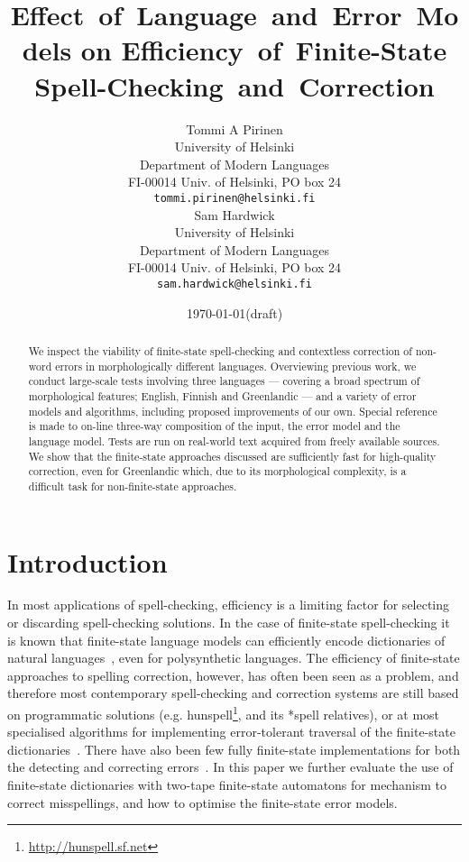 \documentclass[11pt]{article}
\title{Effect~of~Language~and~Error~Models on Efficiency~of~Finite-State
Spell-Checking~and~Correction}
\author{
Tommi A Pirinen\\
University of Helsinki\\
Department of Modern Languages\\
FI-00014 Univ. of Helsinki, PO box 24\\
{\tt tommi.pirinen@helsinki.fi} \\\And
Sam Hardwick\\
University of Helsinki\\
Department of Modern Languages\\
FI-00014 Univ. of Helsinki, PO box 24\\
{\tt sam.hardwick@helsinki.fi} \\
}
\date{\today (draft)}
\begin{document}
\maketitle 

\begin{abstract} We inspect the viability of finite-state
spell-checking and contextless correction of non-word errors in morphologically
different languages. Overviewing previous
work, we conduct large-scale tests involving three languages
--- covering a broad spectrum of morphological features;
English, Finnish and Greenlandic --- and a variety of
error models and algorithms, including proposed
improvements of our own. Special reference is made to on-line
three-way composition of the input, the error model and the language model.
Tests are run on real-world text acquired from
freely available sources.
We show that the finite-state approaches discussed are sufficiently fast
for high-quality correction, even for Greenlandic which, due to its morphological
complexity, is a difficult task for non-finite-state approaches.
\end{abstract}

\section{Introduction}
\label{sec:introduction}

In most applications of spell-checking, efficiency is a limiting factor for
selecting or discarding spell-checking solutions. In the case of finite-state
spell-checking it is known that finite-state language models can efficiently
encode dictionaries of natural languages~\cite{beesley/2003}, even for
polysynthetic languages. The efficiency of finite-state approaches to spelling
correction, however, has often been seen as a problem, and therefore most
contemporary spell-checking and correction systems are still based on
programmatic solutions (e.g.  hunspell\footnote{\url{http://hunspell.sf.net}},
and its *spell relatives), or at most specialised algorithms for implementing
error-tolerant traversal of the finite-state
dictionaries~\cite{oflazer/1996,hulden/2009}. There have also been few fully
finite-state implementations for both the detecting and correcting
errors~\cite{schulz/2002,pirinen/2010/lrec}. In this paper we further evaluate
the use of finite-state dictionaries with two-tape finite-state automatons for
mechanism to correct misspellings, and how to optimise the finite-state error
models.
\end{document}
